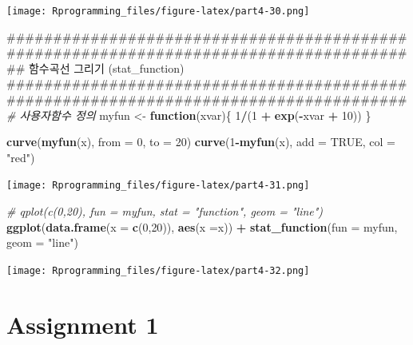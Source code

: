 \documentclass[10pt,]{krantz}
\makeatletter
\newenvironment{Shaded}{\begin{snugshade}}{\end{snugshade}}
\newcommand{\KeywordTok}[1]{\textcolor[rgb]{0.13,0.29,0.53}{\textbf{#1}}}
\newcommand{\DataTypeTok}[1]{\textcolor[rgb]{0.13,0.29,0.53}{#1}}
\newcommand{\DecValTok}[1]{\textcolor[rgb]{0.00,0.00,0.81}{#1}}
\newcommand{\StringTok}[1]{\textcolor[rgb]{0.31,0.60,0.02}{#1}}
\newcommand{\CommentTok}[1]{\textcolor[rgb]{0.56,0.35,0.01}{\textit{#1}}}
\newcommand{\OtherTok}[1]{\textcolor[rgb]{0.56,0.35,0.01}{#1}}
\newcommand{\ControlFlowTok}[1]{\textcolor[rgb]{0.13,0.29,0.53}{\textbf{#1}}}
\newcommand{\OperatorTok}[1]{\textcolor[rgb]{0.81,0.36,0.00}{\textbf{#1}}}
\newcommand{\NormalTok}[1]{#1}
\newenvironment{kframe}{%
\medskip{}
\setlength{\fboxsep}{.8em}
 \def\at@end@of@kframe{}%
 \ifinner\ifhmode%
  \def\at@end@of@kframe{\end{minipage}}%
  \begin{minipage}{\columnwidth}%
 \fi\fi%
 \def\FrameCommand##1{\hskip\@totalleftmargin \hskip-\fboxsep
 \colorbox{shadecolor}{##1}\hskip-\fboxsep
     \hskip-\linewidth \hskip-\@totalleftmargin \hskip\columnwidth}%
 \MakeFramed {\advance\hsize-\width
   \@totalleftmargin\z@ \linewidth\hsize
   \@setminipage}}%
 {\par\unskip\endMakeFramed%
 \at@end@of@kframe}
\renewenvironment{Shaded}{\begin{kframe}}{\end{kframe}}
\theoremstyle{definition}
\theoremstyle{definition}
\theoremstyle{remark}
\makeatother
\begin{document}
\texttt{[image: Rprogramming\_files/figure-latex/part4-30.png]}

\begin{Shaded}
\begin{Highlighting}[]


\NormalTok{######################################################################################}
\NormalTok{## 함수곡선 그리기  (stat_function)}
\NormalTok{######################################################################################}
\CommentTok{# 사용자함수 정의}
\NormalTok{myfun <-}\StringTok{ }\ControlFlowTok{function}\NormalTok{(xvar)\{}
  \DecValTok{1}\OperatorTok{/}\NormalTok{(}\DecValTok{1} \OperatorTok{+}\StringTok{ }\KeywordTok{exp}\NormalTok{(}\OperatorTok{-}\NormalTok{xvar }\OperatorTok{+}\StringTok{ }\DecValTok{10}\NormalTok{))}
\NormalTok{\}}

\KeywordTok{curve}\NormalTok{(}\KeywordTok{myfun}\NormalTok{(x), }\DataTypeTok{from =} \DecValTok{0}\NormalTok{, }\DataTypeTok{to =} \DecValTok{20}\NormalTok{)}
\KeywordTok{curve}\NormalTok{(}\DecValTok{1}\OperatorTok{-}\KeywordTok{myfun}\NormalTok{(x), }\DataTypeTok{add =} \OtherTok{TRUE}\NormalTok{, }\DataTypeTok{col =} \StringTok{"red"}\NormalTok{)}
\end{Highlighting}
\end{Shaded}

\texttt{[image: Rprogramming\_files/figure-latex/part4-31.png]}

\begin{Shaded}
\begin{Highlighting}[]


\CommentTok{# qplot(c(0,20), fun = myfun, stat = "function", geom = "line")}
\KeywordTok{ggplot}\NormalTok{(}\KeywordTok{data.frame}\NormalTok{(}\DataTypeTok{x =} \KeywordTok{c}\NormalTok{(}\DecValTok{0}\NormalTok{,}\DecValTok{20}\NormalTok{)), }\KeywordTok{aes}\NormalTok{(}\DataTypeTok{x =}\NormalTok{x)) }\OperatorTok{+}\StringTok{ }\KeywordTok{stat_function}\NormalTok{(}\DataTypeTok{fun =}\NormalTok{ myfun, }\DataTypeTok{geom =} \StringTok{"line"}\NormalTok{)}
\end{Highlighting}
\end{Shaded}

\texttt{[image: Rprogramming\_files/figure-latex/part4-32.png]}

\cleardoublepage 

\appendix {}


\section{Assignment 1}\label{assignment-1}
\end{document}
